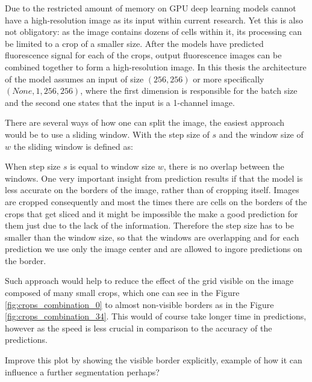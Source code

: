 Due to the restricted amount of memory on GPU deep learning models cannot have a high-resolution image as its input within current research. Yet this is also not obligatory: as the image contains dozens of cells within it, its processing can be limited to a crop of a smaller size. After the models have predicted fluorescence signal for each of the crops, output fluorescence images can be combined together to form a high-resolution image. In this thesis the architecture of the model assumes an input of size $(256, 256)$ or more specifically $(None, 1, 256, 256)$, where the first dimension is responsible for the batch size and the second one states that the input is a 1-channel image. 

There are several ways of how one can split the image, the easiest approach would be to use a sliding window. With the step size of $s$ and the window size of $w$ the sliding window is defined as: 

When step size $s$ is equal to window size $w$, there is no overlap between the windows. One very important insight from prediction results if that the model is less accurate on the borders of the image, rather than of cropping itself. Images are cropped consequently and most the times there are cells on the borders of the crops that get sliced and it might be impossible the make a good prediction for them just due to the lack of the information. Therefore the step size has to be smaller than the window size, so that the windows are overlapping and for each prediction we use only the image center and are allowed to ingore predictions on the border. 

Such approach would help to reduce the effect of the grid visible on the image composed of many small crops, which one can see in the Figure \ref{fig:crops_combination_0} to almost non-visible borders as in the Figure \ref{fig:crops_combination_34}. This would of course take longer time in predictions, however as the speed is less crucial in comparison to the accuracy of the predictions.

Improve this plot by showing the visible border explicitly, example of how it can influence a further segmentation perhaps?